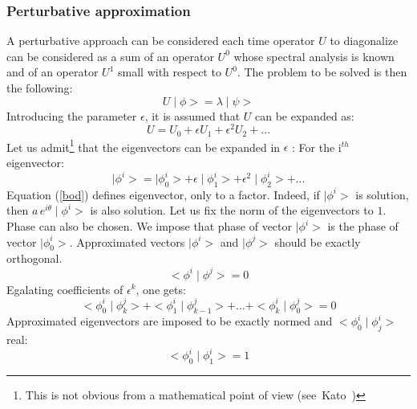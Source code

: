 \documentclass[12pt]{book}
\begin{document}
\subsubsection{Perturbative approximation}
A perturbative approach can be considered each time operator $U$ to
diagonalize can be considered as a sum of an operator $U^{0}$ whose spectral
analysis is known and of an operator $U^{1}$ small with respect to $U^{0}$.
The problem to be solved is then the 
following:
\begin{equation} 
U\mid  \phi \mathrel{>}  = \lambda\mid  \psi \mathrel{>} \label{bod}
\end{equation}
Introducing the parameter $\epsilon$, it is assumed that $U$
can be expanded as:
\begin{equation} 
U=U_{0}+\epsilon U_{1}+\epsilon ^{2}U_2+...
\end{equation}
Let us admit\footnote{This is not obvious from a mathematical point of view
  (see~{Kato}~\cite{ma:equad:Kato66})} that the eigenvectors can be expanded
in $\epsilon$ :
For the  i$^{th}$ eigenvector:
\begin{equation} 
\mid \phi^{i}\mathrel{>} =\mid \phi^{i}_{0}\mathrel{>} +\epsilon
\mid \phi^{i}_{1}\mathrel{>} +\epsilon^{2}\mid \phi^{i}_{2}\mathrel{>} +...
\label{hyph} 
\end{equation}
Equation (\ref{bod}) defines eigenvector, only to a factor.
Indeed, if $\mid \phi^{i}\mathrel{>} $ is solution, then
$a\,e^{i\theta}\mid \phi^{i}\mathrel{>} $ is also solution. Let us fix the norm of
the eigenvectors to $1$. Phase can also be chosen. We impose that
phase of vector $\mid \phi^{i}\mathrel{>} $ is the phase of vector
$\mid \phi^{i}_0\mathrel{>} $.
Approximated vectors $\mid \phi^{i}\mathrel{>} $ and
$\mid \phi^{j}\mathrel{>} $ should be exactly orthogonal.
\begin{equation} 
\mathrel{<} \phi^{i}\mid \phi^{j}\mathrel{>} =0 
\end{equation}
Egalating coefficients of $\epsilon^k$, one gets:
\begin{equation}\label{eqortper}
\mathrel{<} \phi^{i}_{0}\mid \phi^{j}_{k}\mathrel{>} +\mathrel{<} \phi^{i}_{1}\mid
\phi^{j}_{k-1}\mathrel{>} +\ldots+\mathrel{<} \phi^{i}_{k}\mid
\phi^{j}_{0}\mathrel{>} =0 
\end{equation}
%
Approximated eigenvectors are imposed to be exactly normed and 
$\mathrel{<} \phi^{i}_{0}\mid \phi^{i}_{j}\mathrel{>} $ real:
\begin{equation} 
\mathrel{<} \phi^{i}_{0}\mid \phi^{i}_{1}\mathrel{>} =1 
\end{equation}
\end{document}

